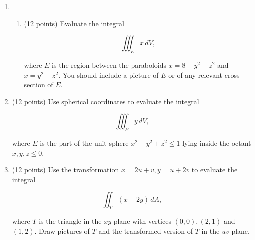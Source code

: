 \documentclass[12 pt]{report}
\begin{document}
\newpage
\begin{enumerate}

\item \begin{enumerate} 

\item (12 points) Evaluate the integral 

\[
\iiint_E x \, dV,
\]

where $E$ is the region between the paraboloids $x = 8 - y^2 - z^2$ and $x = y^2 + z^2$. You should include a picture of $E$ or of any relevant cross section of $E$. 

\vfill
\end{enumerate}


\newpage


\item (12 points) Use spherical coordinates to evaluate the integral 

\[
\iiint_E y \, dV,
\]

where $E$ is the part of the unit sphere $x^2+y^2+z^2 \leq 1$ lying inside the octant $x,y,z \leq 0$. 

\vfill



%
%
%
%
%
%
%
%
%
%
%
%

\newpage

\item (12 points) Use the transformation $x = 2u + v, y = u + 2v$ to evaluate the integral

\[
\iint_T (x-2y) \, dA,
\]

where $T$ is the triangle in the $xy$ plane with vertices $(0,0), (2,1)$ and $(1,2)$. Draw pictures of $T$ and the transformed version of $T$ in the $uv$ plane. 

\vfill 



\end{enumerate}
\end{document}

